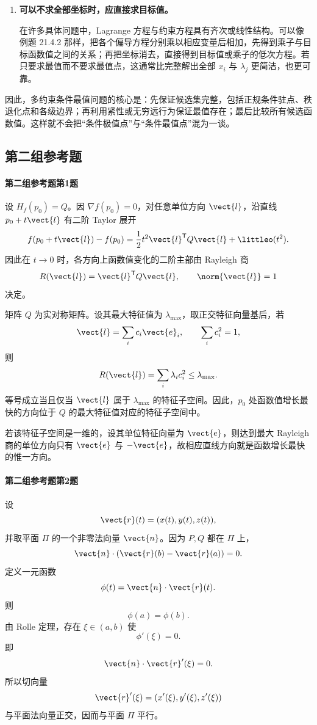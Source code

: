 \begin{xsolution}
\begin{enumerate}[label=\arabic*.]
  \item \textbf{可以不求全部坐标时，应直接求目标值。}

  在许多具体问题中，Lagrange 方程与约束方程具有齐次或线性结构。可以像例题 21.4.2 那样，把各个偏导方程分别乘以相应变量后相加，先得到乘子与目标函数值之间的关系；再把坐标消去，直接得到目标值或乘子的低次方程。若只要求最值而不要求最值点，这通常比完整解出全部 $x_i$ 与 $\lambda_j$ 更简洁，也更可靠。
\end{enumerate}

因此，多约束条件最值问题的核心是：先保证候选集完整，包括正规条件驻点、秩退化点和各级边界；再利用紧性或无穷远行为保证最值存在；最后比较所有候选函数值。这样就不会把“条件极值点”与“条件最值点”混为一谈。
\end{xsolution}
\subsection*{第二组参考题}

\paragraph{第二组参考题第1题}
\begin{xsolution}
设 $H_f(p_0)=Q$。因 $\nabla f(p_0)=0$，对任意单位方向 $\vect{l}$，沿直线 $p_0+t\vect{l}$ 有二阶 Taylor 展开
\[
  f(p_0+t\vect{l})-f(p_0)
  =\frac12t^2\vect{l}^{\mathsf T}Q\vect{l}+\littleo(t^2).
\]
因此在 $t\to0$ 时，各方向上函数值变化的二阶主部由 Rayleigh 商
\[
  R(\vect{l})=\vect{l}^{\mathsf T}Q\vect{l},
  \qquad \norm{\vect{l}}=1
\]
决定。

矩阵 $Q$ 为实对称矩阵。设其最大特征值为 $\lambda_{\max}$，取正交特征向量基后，若
\[
  \vect{l}=\sum_i c_i\vect{e}_i,
  \qquad
  \sum_i c_i^2=1,
\]
则
\[
  R(\vect{l})=\sum_i\lambda_i c_i^2\le\lambda_{\max}.
\]
等号成立当且仅当 $\vect{l}$ 属于 $\lambda_{\max}$ 的特征子空间。因此，$p_0$ 处函数值增长最快的方向位于 $Q$ 的最大特征值对应的特征子空间中。

若该特征子空间是一维的，设其单位特征向量为 $\vect{e}$，则达到最大 Rayleigh 商的单位方向只有 $\vect{e}$ 与 $-\vect{e}$，故相应直线方向就是函数增长最快的惟一方向。
\end{xsolution}

\paragraph{第二组参考题第2题}
\begin{xsolution}
设
\[
  \vect{r}(t)=(x(t),y(t),z(t)),
\]
并取平面 $\Pi$ 的一个非零法向量 $\vect{n}$。因为 $P,Q$ 都在 $\Pi$ 上，
\[
  \vect{n}\cdot(\vect{r}(b)-\vect{r}(a))=0.
\]
定义一元函数
\[
  \phi(t)=\vect{n}\cdot\vect{r}(t).
\]
则
\[
  \phi(a)=\phi(b).
\]
由 Rolle 定理，存在 $\xi\in(a,b)$ 使
\[
  \phi'(\xi)=0.
\]
即
\[
  \vect{n}\cdot\vect{r}'(\xi)=0.
\]
所以切向量
\[
  \vect{r}'(\xi)=(x'(\xi),y'(\xi),z'(\xi))
\]
与平面法向量正交，因而与平面 $\Pi$ 平行。
\end{xsolution}


